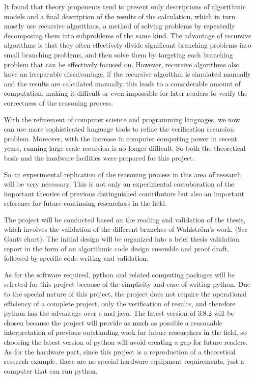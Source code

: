 \documentclass{sigchi}
\begin{document}
It found that theory proponents tend to present only descriptions of algorithmic models and a final description of the results of the calculation, which in turn mostly use recursive algorithms, a method of solving problems by repeatedly decomposing them into subproblems of the same kind. The advantage of recursive algorithms is that they often effectively divide significant branching problems into small branching problems, and then solve them by targeting each branching problem that can be effectively focused on. However, recursive algorithms also have an irreparable disadvantage, if the recursive algorithm is simulated manually and the results are calculated manually, this leads to a considerable amount of computation, making it difficult or even impossible for later readers to verify the correctness of the reasoning process.

With the refinement of computer science and programming languages, we now can use more sophisticated language tools to refine the verification recursion problem. Moreover, with the increase in computer computing power in recent years, running large-scale recursion is no longer difficult. So both the theoretical basis and the hardware facilities were prepared for this project.

So an experimental replication of the reasoning process in this area of research will be very necessary. This is not only an experimental corroboration of the important theories of previous distinguished contributors but also an important reference for future continuing researchers in the field.

The project will be conducted based on the reading and validation of the thesis, which involves the validation of the different branches of Wahlström's work. (See Gantt chart). The initial design will be organized into a brief thesis validation report in the form of an algorithmic code design ensemble and proof draft, followed by specific code writing and validation.

As for the software required, python and related computing packages will be selected for this project because of the simplicity and ease of writing python. Due to the special nature of this project, the project does not require the operational efficiency of a complete project, only the verification of results, and therefore python has the advantage over c and java. The latest version of 3.8.2 will be chosen because the project will provide as much as possible a reasonable interpretation of previous outstanding work for future researchers in the field, so choosing the latest version of python will avoid creating a gap for future readers. As for the hardware part, since this project is a reproduction of a theoretical research example, there are no special hardware equipment requirements, just a computer that can run python.
\end{document}
